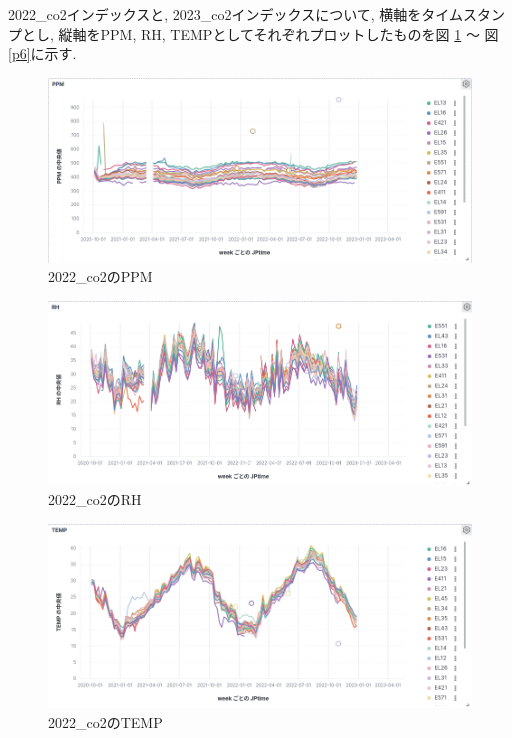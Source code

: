 2022\_co2インデックスと, 2023\_co2インデックスについて, 横軸をタイムスタンプとし, 縦軸をPPM, RH, TEMPとしてそれぞれプロットしたものを図 \ref{p1} 〜 図 \ref{p6}に示す.

\begin{figure}[!ht]
    \begin{center}
        \includegraphics[width=160mm]{sotu/figure/2022_ppm.png}
        \caption{2022\_co2のPPM}
        \label{p1}
    \end{center}
\end{figure}

\begin{figure}[!ht]
    \begin{center}
        \includegraphics[width=160mm]{sotu/figure/2022_rh.png}
        \caption{2022\_co2のRH}
        \label{p2}
    \end{center}
\end{figure}

\begin{figure}[!ht]
    \begin{center}
        \includegraphics[width=160mm]{sotu/figure/2022_temp.png}
        \caption{2022\_co2のTEMP}
        \label{p3}
    \end{center}
\end{figure}

